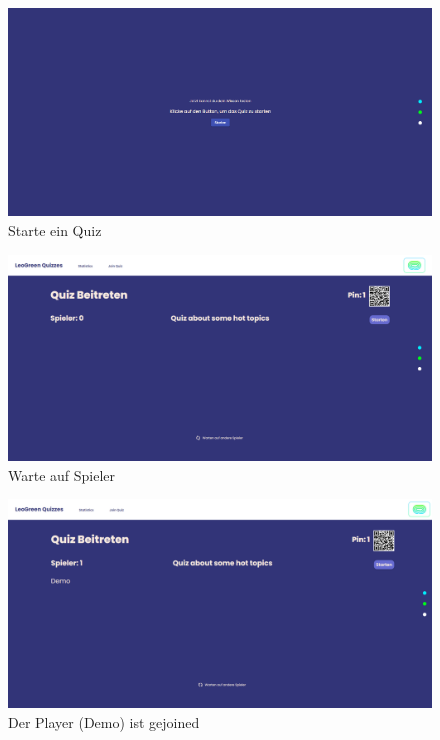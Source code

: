 \begin{figure}
    \centering
    \includegraphics[scale=0.3]{pics/image (3).png}
    \caption{Starte ein Quiz}
    \label{fig:impl:img4}
\end{figure}
\begin{figure}
    \centering
    \includegraphics[scale=0.3]{pics/image (4).png}
    \caption{Warte auf Spieler}
    \label{fig:impl:img5}
\end{figure}
\begin{figure}
    \centering
    \includegraphics[scale=0.3]{pics/image (5).png}
    \caption{Der Player (Demo) ist gejoined}
    \label{fig:impl:img6}
\end{figure}
